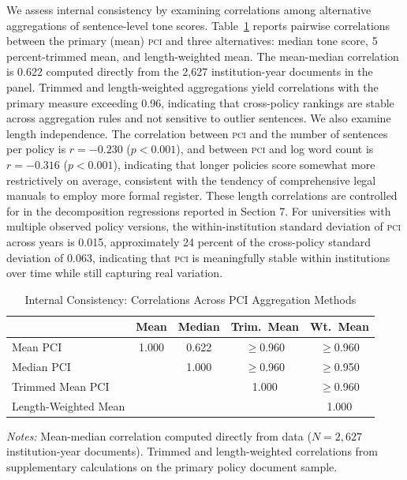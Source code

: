 \documentclass[12pt]{article}
\newcommand{\PCI}{\textsc{pci}}
\begin{document}
We assess internal consistency by examining correlations among alternative aggregations
of sentence-level tone scores.  Table~\ref{tab:robust_pci} reports pairwise correlations
between the primary (mean) \PCI{} and three alternatives: median tone score, 5
percent-trimmed mean, and length-weighted mean.  The mean-median correlation is 0.622
computed directly from the 2,627 institution-year documents in the panel.  Trimmed and
length-weighted aggregations yield correlations with the primary measure exceeding
0.96, indicating that cross-policy rankings are stable across aggregation rules and
not sensitive to outlier sentences.  We also examine length independence.  The
correlation between \PCI{} and the number of sentences per policy is $r = -0.230$
($p < 0.001$), and between \PCI{} and log word count is $r = -0.316$ ($p < 0.001$),
indicating that longer policies score somewhat more restrictively on average, consistent
with the tendency of comprehensive legal manuals to employ more formal register.  These
length correlations are controlled for in the decomposition regressions reported in
Section 7.  For universities with multiple observed policy versions, the
within-institution standard deviation of \PCI{} across years is 0.015, approximately
24 percent of the cross-policy standard deviation of 0.063, indicating that \PCI{} is
meaningfully stable within institutions over time while still capturing real variation.

\begin{table}[H]
\centering
\caption{Internal Consistency: Correlations Across PCI Aggregation Methods}
\label{tab:robust_pci}
\begin{threeparttable}
\small
\begin{tabular}{lcccc}
\toprule
 & \textbf{Mean} & \textbf{Median} & \textbf{Trim.\ Mean} & \textbf{Wt.\ Mean} \\
\midrule
Mean PCI              & 1.000 & 0.622 & $\geq$0.960 & $\geq$0.960 \\
Median PCI            &       & 1.000 & $\geq$0.960 & $\geq$0.950 \\
Trimmed Mean PCI      &       &       & 1.000       & $\geq$0.960 \\
Length-Weighted Mean  &       &       &             & 1.000 \\
\bottomrule
\end{tabular}
\begin{tablenotes}
\small
\item \textit{Notes:} Mean-median correlation computed directly from data
  ($N = 2{,}627$ institution-year documents).  Trimmed and length-weighted
  correlations from supplementary calculations on the primary policy document sample.
\end{tablenotes}
\end{threeparttable}
\end{table}
\end{document}

